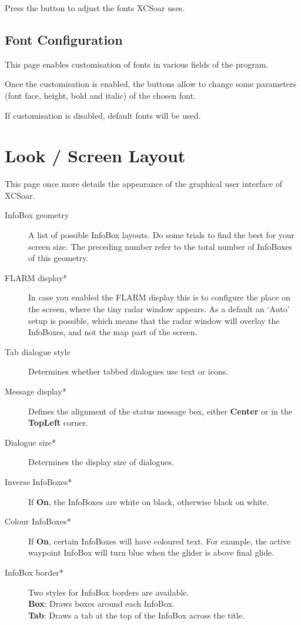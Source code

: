 Press the  button to adjust the fonts XCSoar uses.

\subsection*{Font Configuration}

This page enables customisation of fonts in various fields of the program.


Once the customisation is enabled, the  buttons allow to change 
some parameters (font face, height, bold and italic) of the chosen font.

If customisation is disabled, default fonts will be used.


\section{Look / Screen Layout}\label{sec:interface-appearance}

This page once more details the appearance of the graphical user interface of XCSoar.

\begin{description}
\item[InfoBox geometry]  A list of possible InfoBox layouts. Do some trials to find the 
  best for your screen size. The preceding number refer to the total number of 
  InfoBoxes of this geometry.
\item[FLARM display*]  \label{conf:flarmradar-place}
  In case you enabled the FLARM display this is to configure the
  place on the screen, where the tiny radar window appears. As a default an `Auto' setup 
  is possible, which means that the radar window will overlay the InfoBoxes, and not the map
  part of the screen.
\item[Tab dialogue style]  Determines whether tabbed dialogues use text or icons.
\item[Message display*]  Defines the alignment of the status message box, either 
  {\bf Center} or in the {\bf TopLeft} corner.
\item[Dialogue size*]  Determines the display size of dialogues.
\item[Inverse InfoBoxes*]  If {\bf On}, the InfoBoxes are white on black, otherwise 
  black on white.
\item[Colour InfoBoxes*]  If {\bf On}, certain InfoBoxes will have coloured text. For 
  example, the active waypoint InfoBox will turn blue when the glider is above final 
  glide.
\item[InfoBox border*]  Two styles for InfoBox borders are available. \\
  {\bf Box}: Draws boxes around each InfoBox. \\
  {\bf Tab}: Draws a tab at the top of the InfoBox across the 
  title. \\
\end{description}


